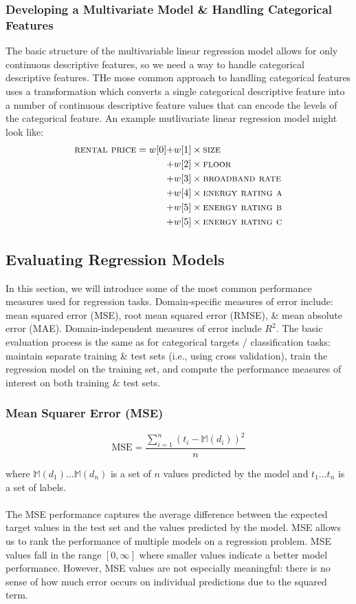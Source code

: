 \documentclass[a4paper,11pt]{article}
\begin{document}
\subsubsection{Developing a Multivariate Model \& Handling Categorical Features}
The basic structure of the multivariable linear regression model allows for only continuous descriptive features, so we need a way to handle categorical descriptive features.
THe mose common approach to handling categorical features uses a transformation which converts a single categorical descriptive feature into a number of continuous descriptive feature values that can encode the levels of the categorical feature.
An example mutlivariate linear regression model might look like:
\begin{align*}
    \textsc{rental price} = w[0] +& w[1] \times \textsc{size} \\
    +& w[2] \times \textsc{floor} \\
    +& w[3] \times \textsc{broadband rate} \\
    +& w[4] \times \textsc{energy rating a} \\
    +& w[5] \times \textsc{energy rating b} \\
    +& w[5] \times \textsc{energy rating c} \\
\end{align*}

\subsection{Evaluating Regression Models}
In this section, we will introduce some of the most common performance measures used for regression tasks.
Domain-specific measures of error include: mean squared error (MSE), root mean squared error (RMSE), \& mean absolute error (MAE).
Domain-independent measures of error include $R^2$.
The basic evaluation process is the same as for categorical targets / classification tasks:
maintain separate training \& test sets (i.e., using cross validation), train the regression model on the training set, and compute the performance  measures of interest on both training \& test sets.

\subsubsection{Mean Squarer Error (MSE)}
\[
\text{MSE} = \frac{\sum^n_{i=1} \left( t_i - \mathbb{M}(d_i) \right)^2 }{n}
\]

where $\mathbb{M}(d_1) \dots \mathbb{M}(d_n)$ is a set of $n$ values predicted by the model and $t_1 \dots t_n$ is a set of labels.
\\\\
The MSE performance captures the average difference between the expected target values in the test set and the values predicted by the model.
MSE allows us to rank the performance of multiple models on a regression problem.
MSE values fall in the range $[0, \infty]$ where smaller values indicate a better model performance.
However, MSE values are not especially meaningful: there is no sense of how much error occurs on individual predictions due to the squared term.
\end{document}
